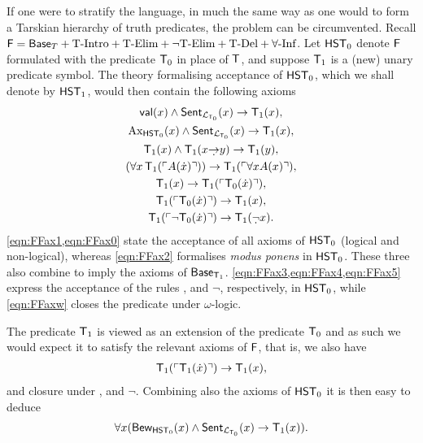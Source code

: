 \documentclass[UKenglish,cleveref,DIV=12]{scrartcl}
\theoremstyle{definition}
\theoremstyle{definition}
\begin{document}
If one were to stratify the language, in much the same way as one would to form a Tarskian hierarchy of truth predicates, the problem can be circumvented. Recall $\mathsf{F}=\mathsf{Base}_T+\text{T-Intro}+\text{T-Elim}+\text{$\lnot$T-Elim}+\text{T-Del}+\text{$\forall$-Inf}$. Let $\mathsf{HST}_0$ denote $\mathsf{F}$ formulated with the predicate $\mathsf{T}_0$ in place of $\mathsf{T}$, and suppose $\mathsf{T}_1$ is a (new) unary predicate symbol. The theory formalising acceptance of $\mathsf{HST}_0$, which we shall denote by $\mathsf{HST}_1$, would then contain the following axioms
\begin{gather}
  \valid(x)\land\Sent_{\L_{\T_0}}(x)\rightarrow \T_1(x),\label{eqn:FFax0}\\
  \set{Ax}_{\HST_0}(x)\land\Sent_{\L_{\T_0}}(x)\rightarrow \T_1(x),\label{eqn:FFax1}\\
  \T_1(x)\land \T_1(x\dimplies y)\rightarrow \T_1(y),\label{eqn:FFax2}\\
  (\forall x\,\T_1(\gn{A(\dot x)}))\rightarrow \T_1(\gn{\forall xA(x)}),\label{eqn:FFaxw}\\
  \T_1(x)\rightarrow \T_1(\gn{\T_0(\dot x)}),\label{eqn:FFax3}\\
  \T_1(\gn{\T_0(\dot x)})\rightarrow \T_1(x),\label{eqn:FFax4}\\
  \T_1(\gn{\lnot \T_0(\dot x)})\rightarrow \T_1(\dlnot x).\label{eqn:FFax5}
\end{gather}
\eqref{eqn:FFax1,eqn:FFax0} state the acceptance of all axioms of $\mathsf{HST}_0$ (logical and non-logical), whereas \eqref{eqn:FFax2} formalises \emph{modus ponens} in $\mathsf{HST}_0$. These three also combine to imply the axioms of $\mathsf{Base}_{\mathsf{T}_1}$. \eqref{eqn:FFax3,eqn:FFax4,eqn:FFax5} express the acceptance of the rules ,  and
$\lnot$, respectively, in $\mathsf{HST}_0$, while \eqref{eqn:FFaxw} closes the
predicate under $\omega$-logic.

The predicate $\mathsf{T}_1$ is viewed as an extension of the predicate $\mathsf{T}_0$ and as such
we would expect it to satisfy the relevant axioms of $\mathsf{F}$, that is, we also have %
\begin{gather*}%
 \T_1(\gn{\T_1(\dot x)})\rightarrow \T_1(x),
\end{gather*}
and closure under ,  and $\lnot$. Combining
also the axioms of $\mathsf{HST}_0$ it is then easy to deduce
\begin{align}\label{eqn:F1reflection}
  \forall x( \mathsf{Bew}_{\mathsf{HST}_0}(x)\land\mathsf{Sent}_{\mathcal{L}_{\mathsf{T}_0}}(x)\rightarrow \mathsf{T}_1(x)).
\end{align}
\end{document}
